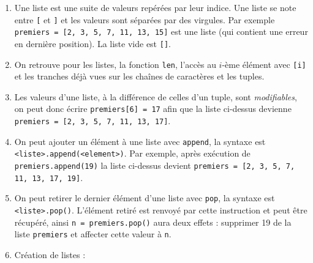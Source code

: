 \documentclass[11pt,a4paper]{article}
\begin{document}
	
	\begin{tcolorbox}[left=0cm,title=\bf{\faPython \; Listes},colbacktitle=cfond]
		\begin{enumerate}
			\item[\ding{182}] Une liste est une suite de valeurs repérées par leur indice. Une liste se note entre {\tt [} et {\tt]} et les valeurs sont séparées par des virgules. Par exemple \texttt{premiers = [2, 3, 5, 7, 11, 13, 15]} est une liste (qui contient une erreur en dernière position). La liste vide est {\tt []}.
			\item[\ding{183}] On retrouve pour les listes, la fonction {\tt len}, l'accès au $i$-ème élément avec {\tt [i]} et les tranches déjà vues sur les chaînes de caractères et les tuples.
			\item[\ding{184}] Les valeurs d'une liste, à la différence de celles d'un tuple, sont \textit{modifiables}, on peut donc écrire \texttt{premiers[6] = 17} afin que la liste ci-dessus devienne \texttt{premiers = [2, 3, 5, 7, 11, 13, 17]}.
			\item[\ding{185}] On peut ajouter un élément à une liste avec {\tt append}, la syntaxe est {\tt <liste>.append(<element>)}. Par exemple, après exécution de \texttt{premiers.append(19)} la liste ci-dessus devient \texttt{premiers = [2, 3, 5, 7, 11, 13, 17, 19]}.
			\item[\ding{186}] On peut retirer le dernier élément d'une liste avec {\tt pop}, la syntaxe est {\tt <liste>.pop()}. L'élément retiré est renvoyé par cette instruction et peut être récupéré, ainsi \texttt{n = premiers.pop()} aura deux effets : supprimer 19 de la liste {\tt premiers} et affecter cette valeur à {\tt n}.
			\item[\ding{187}] Création de listes :
		\end{enumerate}
	\end{tcolorbox}
	
\end{document}
